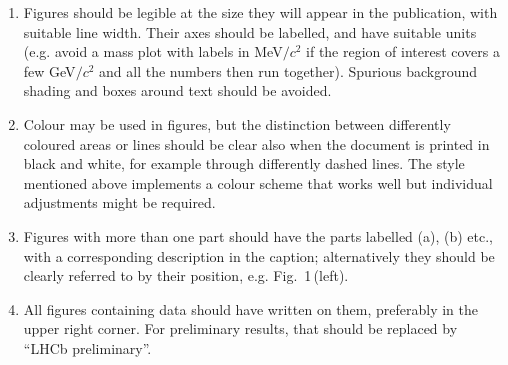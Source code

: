 \begin{enumerate}

\item Figures should be legible at the size they will appear in the
  publication, with suitable line width.  Their axes should be
  labelled, and have suitable units (e.g. avoid a mass plot with
  labels in MeV$/c^2$ if the region of interest covers a few GeV$/c^2$
  and all the numbers then run together).  Spurious background shading
  and boxes around text should be avoided.

\item Colour may be used in figures, but the distinction between
  differently coloured areas or lines should be clear also when the
  document is printed in black and white, for example through
  differently dashed lines. The \lhcb style mentioned above implements
  a colour scheme that works well but individual adjustments might be
  required.

\item Figures with more than one part should have the parts labelled
  (a), (b) etc., with a corresponding description in the caption;
  alternatively they should be clearly referred to by their position,
  e.g. Fig.~1\,(left).

\item All figures containing \lhcb data should have \lhcb written on
  them, preferably in the upper right corner.  For preliminary
  results, that should be replaced by ``LHCb preliminary''.

\end{enumerate}

